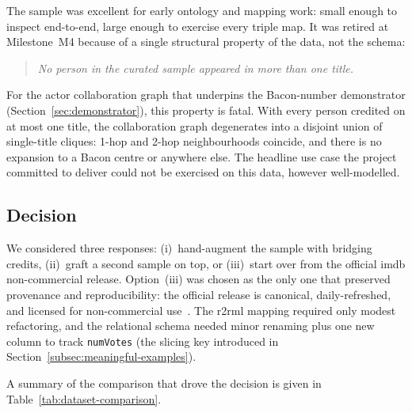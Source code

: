 The sample was excellent for early ontology and mapping work: small enough to inspect end-to-end, large enough to exercise every triple map. It was retired at Milestone~M4 because of a single structural property of the data, not the schema:

\begin{quote}
\textit{No person in the curated sample appeared in more than one title.}
\end{quote}

\noindent For the actor collaboration graph that underpins the Bacon-number demonstrator (Section~\ref{sec:demonstrator}), this property is fatal. With every person credited on at most one title, the collaboration graph degenerates into a disjoint union of single-title cliques: 1-hop and 2-hop neighbourhoods coincide, and there is no expansion to a Bacon centre or anywhere else. The headline use case the project committed to deliver could not be exercised on this data, however well-modelled.

\subsection*{Decision}

We considered three responses: (i)~hand-augment the sample with bridging credits, (ii)~graft a second sample on top, or (iii)~start over from the official \ac{imdb} non-commercial release. Option~(iii) was chosen as the only one that preserved provenance and reproducibility: the official release is canonical, daily-refreshed, and licensed for non-commercial use~\cite{imdb-noncommercial,imdb-terms}. The \ac{r2rml} mapping required only modest refactoring, and the relational schema needed minor renaming plus one new column to track \texttt{numVotes} (the slicing key introduced in Section~\ref{subsec:meaningful-examples}).

A summary of the comparison that drove the decision is given in Table~\ref{tab:dataset-comparison}.

